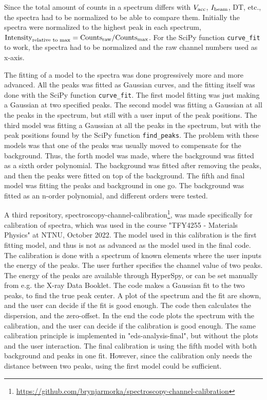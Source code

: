Since the total amount of counts in a spectrum differs with $V_\textnormal{acc}$, $I_\textnormal{beam}$, DT, etc., the spectra had to be normalized to be able to compare them.
Initially the spectra were normalized to the highest peak in each spectrum, $\textnormal{Intensity}_{\textnormal{relative to max}} = \textnormal{Counts}_{\textnormal{raw}} / \textnormal{Counts}_{\textnormal{max}}$.
For the SciPy function \verb|curve_fit| to work, the spectra had to be normalized and the raw channel numbers used as x-axis.



The fitting of a model to the spectra was done progressively more and more advanced.
All the peaks was fitted as Gaussian curves, and the fitting itself was done with the SciPy function \verb|curve_fit|.
The first model fitting was just making a Gaussian at two specified peaks.
The second model was fitting a Gaussian at all the peaks in the spectrum, but still with a user input of the peak positions.
The third model was fitting a Gaussian at all the peaks in the spectrum, but with the peak positions found by the SciPy function \verb|find_peaks|.
The problem with these models was that one of the peaks was usually moved to compensate for the background.
Thus, the forth model was made, where the background was fitted as a sixth order polynomial.
The background was fitted after removing the peaks, and then the peaks were fitted on top of the background.
The fifth and final model was fitting the peaks and background in one go.
The background was fitted as an n-order polynomial, and different orders were tested.



A third repository, spectroscopy-channel-calibration\footnote{\url{https://github.com/brynjarmorka/spectroscopy-channel-calibration}}, was made specifically for calibration of spectra, which was used in the course "TFY4255 - Materials Physics" at NTNU, October 2022.
The model used in this calibration is the first fitting model, and thus is not as advanced as the model used in the final code.
The calibration is done with a spectrum of known elements where the user inputs the energy of the peaks.
The user further specifies the channel value of two peaks.
The energy of the peaks are available through HyperSpy, or can be set manually from e.g. the X-ray Data Booklet.
The code makes a Gaussian fit to the two peaks, to find the true peak center.
A plot of the spectrum and the fit are shown, and the user can decide if the fit is good enough.
The code then calculates the dispersion, and the zero-offset.
In the end the code plots the spectrum with the calibration, and the user can decide if the calibration is good enough.
The same calibration principle is implemented in "eds-analysis-final", but without the plots and the user interaction.
The final calibration is using the fifth model with both background and peaks in one fit.
However, since the calibration only needs the distance between two peaks, using the first model could be sufficient.



